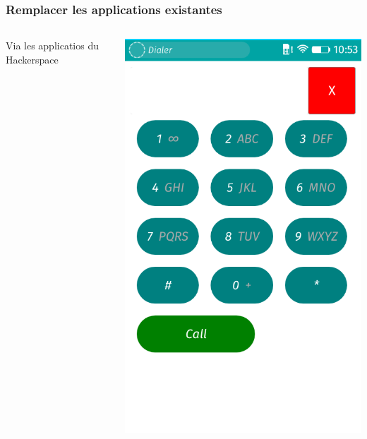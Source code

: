 \documentclass{beamer}
\begin{document}
\begin{frame}
\frametitle{Remplacer les applications existantes}
\begin{columns}[T]
\begin{column}{5cm}
\begin{block}{Via les applicatios du Hackerspace}
\end{block} 
\end{column}
\begin{column}{5cm}
\includegraphics[scale=0.25] {./images/FFOS_Dialer.png} 
\end{column}
\end{columns}  
\end{frame}
\end{document}
